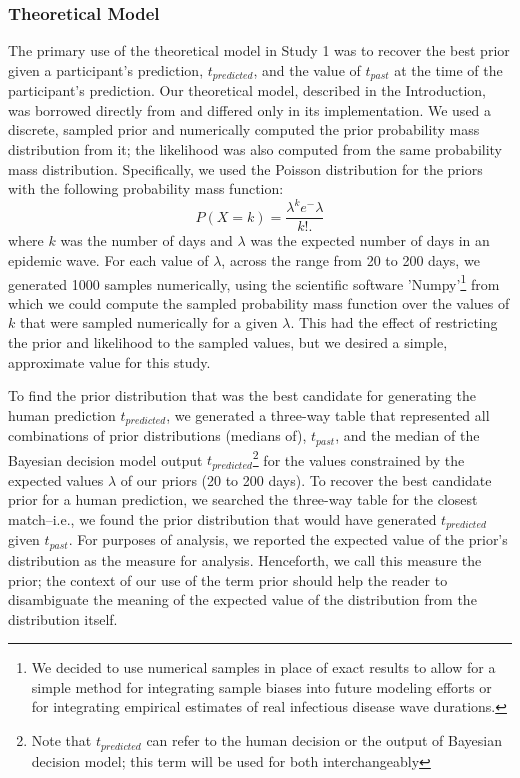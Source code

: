 \documentclass[a4paper,man,natbib]{apa6}
\begin{document}
\subsubsection{Theoretical Model}
The primary use of the theoretical model in Study 1 was to recover the best prior given a participant's prediction, $t_{predicted}$, and the value of $t_{past}$ at the time of the participant's prediction.  Our theoretical model, described in the Introduction, was borrowed directly from \citep{GriffithsTenenbaum2006} and differed only in its implementation. We used a discrete, sampled prior and numerically computed the prior probability mass distribution from it; the likelihood was also computed from the same probability mass distribution.  Specifically, we used the Poisson distribution for the priors with the following probability mass function: 
\begin{equation}\label{eq:poisson}
   P(X=k) =  \frac {\lambda^k e^-{\lambda}}{k!.}
\end{equation}
where $k$ was the number of days and $\lambda$ was the expected number of days in an epidemic wave.  For each value of $\lambda$, across the range from 20 to 200 days, we generated 1000 samples numerically, using the scientific software 'Numpy'\footnote{We decided to use numerical samples in place of exact results to allow for a simple method for integrating sample biases into future modeling efforts or for integrating empirical estimates of real infectious disease wave durations.} from which we could compute the sampled probability mass function over the values of $k$ that were sampled numerically for a given $\lambda$.  This had the effect of restricting the prior and likelihood to the sampled values, but we desired a simple, approximate value for this study.

To find the prior distribution that was the best candidate for generating the human prediction $t_{predicted}$, we generated a three-way table that represented all combinations of prior distributions (medians of), $t_{past}$, and the median of the Bayesian decision model output $t_{predicted}$\footnote{Note that $t_{predicted}$ can refer to the human decision or the output of Bayesian decision model; this term will be used for both interchangeably} for the values constrained by the expected values $\lambda$ of our priors (20 to 200 days).  To recover the best candidate prior for a human prediction, we searched the three-way table for the closest match--i.e., we found the prior distribution that would have generated $t_{predicted}$ given $t_{past}$.  For purposes of analysis, we reported the expected value of the prior's distribution as the measure for analysis. Henceforth, we call this measure the prior; the context of our use of the term prior should help the reader to disambiguate the meaning of the expected value of the distribution from the distribution itself.  
\end{document}
